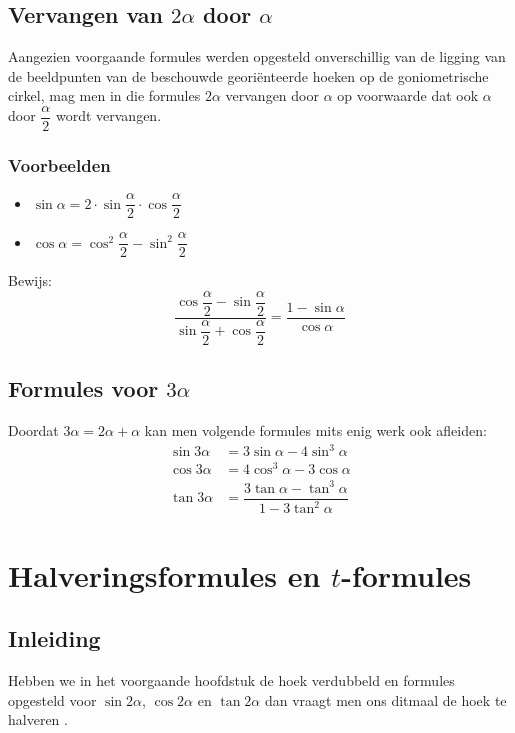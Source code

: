 \documentclass[a4paper,12pt]{article}
\begin{document}
\subsection{Vervangen van $2\alpha$ door $\alpha$}

Aangezien voorgaande formules werden opgesteld onverschillig van de ligging van de
beeldpunten van de beschouwde georiënteerde hoeken op de goniometrische cirkel,
mag men in die formules $2\alpha$ vervangen door $\alpha$ op voorwaarde dat ook
$\alpha$ door $\dfrac{\alpha}{2}$ wordt vervangen.

\subsubsection*{Voorbeelden}
\begin{itemize}
  \item $\sin\alpha = 2\cdot\sin\dfrac{\alpha}{2}\cdot\cos\dfrac{\alpha}{2}$
  \item $\cos\alpha = \cos^2\dfrac{\alpha}{2}-\sin^2\dfrac{\alpha}{2}$
\end{itemize}

\begin{oefening}
Bewijs:
$$\dfrac{\cos\dfrac{\alpha}{2}-\sin\dfrac{\alpha}{2}}{\sin\dfrac{\alpha}{2}+\cos\dfrac{\alpha}{2}}=\dfrac{1-\sin\alpha}{\cos\alpha}$$
\end{oefening}

\subsection{Formules voor $3\alpha$}

Doordat $3\alpha=2\alpha + \alpha$ kan men volgende formules mits enig werk ook afleiden:
\begin{align*}
  \sin 3\alpha &= 3\sin\alpha -4\sin^3\alpha\\
  \cos 3\alpha &= 4\cos^3\alpha -3\cos\alpha\\
  \tan 3\alpha &= \dfrac{3\tan\alpha -\tan^3\alpha}{1-3\tan^2\alpha}
\end{align*}

\pagebreak
\section{Halveringsformules en $t$-formules}

\vspace*{-0.5cm}
\subsection{Inleiding}
Hebben we in het voorgaande hoofdstuk de hoek verdubbeld en formules opgesteld
voor $\sin 2\alpha$, $\cos 2\alpha$ en $\tan 2\alpha$ dan vraagt men ons ditmaal de hoek te halveren .
\end{document}
